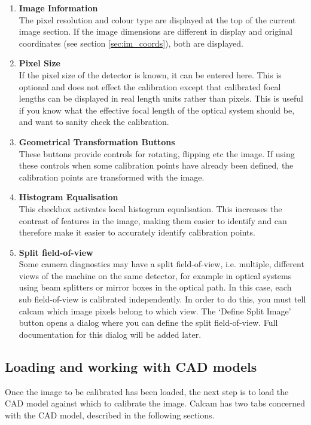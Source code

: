 \documentclass[12pt]{article}
\begin{document}
\begin{enumerate}[resume]
\item{\textbf{Image Information}\\The pixel resolution and colour type are displayed at the top of the current image section. If the image dimensions are different in display and original coordinates (see section \ref{sec:im_coords}), both are displayed.}
\item{\textbf{Pixel Size}\\If the pixel size of the detector is known, it can be entered here. This is optional and does not effect the calibration except that calibrated focal lengths can be displayed in real length units rather than pixels. This is useful if you know what the effective focal length of the optical system should be, and want to sanity check the calibration.}
\item{\textbf{Geometrical Transformation Buttons}\\These buttons provide controls for rotating, flipping etc the image. If using these controls when some calibration points have already been defined, the calibration points are transformed with the image.}
\item{\textbf{Histogram Equalisation}\\This checkbox activates local histogram equalisation. This increases the contrast of features in the image, making them easier to identify and can therefore make it easier to accurately identify calibration points.}
\item{\textbf{Split field-of-view}\\Some camera diagnostics may have a split field-of-view, i.e. multiple, different views of the machine on the same detector, for example in optical systems using beam splitters or mirror boxes in the optical path. In this case, each sub field-of-view is calibrated independently. In order to do this, you must tell calcam which image pixels belong to which view. The `Define Split Image' button opens a dialog where you can define the split field-of-view. Full documentation for this dialog will be added later.}
\end{enumerate}

\subsection{Loading and working with CAD models}
Once the image to be calibrated has been loaded, the next step is to load the CAD model against which to calibrate the image. Calcam has two tabs concerned with the CAD model, described in the following sections.
\end{document}
